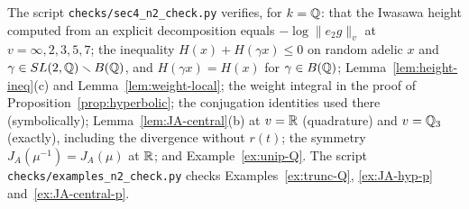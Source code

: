 \begin{remarkrev}\label{rem:verified-sec4}
The script \texttt{checks/sec4\_n2\_check.py} verifies, for $k=\mathbb{Q}$: that
the Iwasawa height computed from an explicit decomposition equals
$-\log\|e_2g\|_v$ at $v=\infty,2,3,5,7$; the inequality
$H(x)+H(\gamma x)\le0$ on random adelic $x$ and $\gamma\in
SL(2,\mathbb{Q})\smallsetminus B(\mathbb{Q})$, and $H(\gamma x)=H(x)$ for $\gamma\in
B(\mathbb{Q})$; Lemma~\ref{lem:height-ineq}(c) and Lemma~\ref{lem:weight-local};
the weight integral in the proof of Proposition~\ref{prop:hyperbolic};
the conjugation identities used there (symbolically);
Lemma~\ref{lem:JA-central}(b) at $v=\mathbb{R}$ (quadrature) and $v=\mathbb{Q}_3$
(exactly), including the divergence without $r(t)$; the symmetry
$J_A(\mu^{-1})=J_A(\mu)$ at $\mathbb{R}$; and Example~\ref{ex:unip-Q}.
The script \texttt{checks/examples\_n2\_check.py} checks
Examples~\ref{ex:trunc-Q}, \ref{ex:JA-hyp-p} and~\ref{ex:JA-central-p}.
\end{remarkrev}
